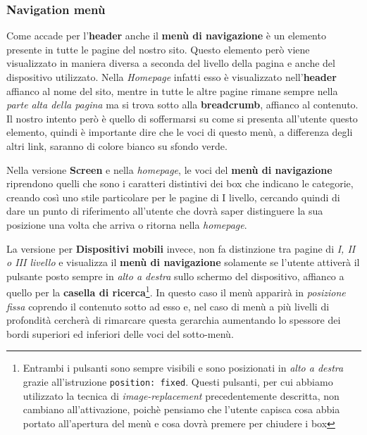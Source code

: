 \subsubsection{Navigation menù}\label{sec:Pres-Nav}
Come accade per l'\textbf{header} anche il \textbf{menù di navigazione} è un
elemento presente in tutte le pagine del nostro sito. Questo elemento però
viene visualizzato in maniera diversa a seconda del livello della pagina e
anche del dispositivo utilizzato. Nella \textit{Homepage} infatti esso è
visualizzato nell'\textbf{header} affianco al nome del sito, mentre in tutte
le altre pagine rimane sempre nella \textit{parte alta della pagina} ma si
trova sotto alla \textbf{breadcrumb}, affianco al contenuto. Il nostro intento
però è quello di soffermarsi su come si presenta all'utente questo elemento,
quindi è importante dire che le voci di questo menù, a differenza degli altri
link, saranno di colore bianco su sfondo verde.

Nella versione \textbf{Screen} e nella \textit{homepage}, le voci del
\textbf{menù di navigazione} riprendono quelli che sono i caratteri distintivi
dei box che indicano le categorie, creando così uno stile particolare per le
pagine di I livello, cercando quindi di dare un punto di riferimento
all'utente che dovrà saper distinguere la sua posizione una volta che arriva o
ritorna nella \textit{homepage}.

La versione per \textbf{Dispositivi mobili} invece, non fa distinzione tra
pagine di \textit{I, II o III livello} e visualizza il \textbf{menù di
navigazione} solamente se l'utente attiverà il pulsante posto sempre in
\textit{alto a destra} sullo schermo del dispositivo, affianco a quello per la
\textbf{casella di ricerca}\footnote{Entrambi i pulsanti sono sempre visibili
e sono posizionati in \textit{alto a destra} grazie all'istruzione
\texttt{position: fixed}. Questi pulsanti, per cui abbiamo utilizzato la
tecnica di \textit{image-replacement} precedentemente descritta, non cambiano
all'attivazione, poichè pensiamo che l'utente capisca cosa abbia portato
all'apertura del menù e cosa dovrà premere per chiudere i box}. In questo caso
il menù apparirà in \textit{posizione fissa} coprendo il contenuto sotto ad
esso e, nel caso di menù a più livelli di profondità cercherà di rimarcare
questa gerarchia aumentando lo spessore dei bordi superiori ed inferiori delle
voci del sotto-menù.

